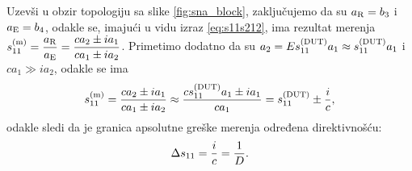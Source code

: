 \documentclass[a4paper, 12pt, diplomski]{etf}
\begin{document}
Uzevši u obzir 
topologiju sa slike \ref{fig:sna_block}, zaključujemo da su 
$a_{\rm R} = b_3$ i $a_{\rm E} = b_4$,
odakle se, imajući u 
vidu izraz \eqref{eq:s11s212}, ima rezultat merenja
$ s_{\rm 11}^{\rm (m)} = \dfrac{a_{\rm R}}{a_{\rm E}} = 
\dfrac{ ca_2 \pm ia_1}{ ca_1 \pm ia_2}$. Primetimo dodatno 
da su $a_2 = E s_{11}^{\rm (DUT)} a_1 \approx s_{\rm 11}^{\rm (DUT)} a_1 $ i 
$
    ca_1 \gg ia_2
    \label{eq:ca1ia2}
$, odakle se ima
\begin{equation}
    s_{\rm 11}^{\rm (m)} = 
\dfrac{ ca_2 \pm ia_1}{ ca_1 \pm ia_2}
\approx 
\dfrac{ c s_{\rm 11}^{\rm (DUT)} a_1 \pm ia_1}{ ca_1} 
= s_{\rm 11}^{\rm (DUT)} \pm \dfrac{i}{c},
\label{eq:ioverc}
\end{equation}
odakle sledi da je granica apsolutne greške
merenja određena direktivnošću:
\begin{equation}
\Delta s_{\rm 11} = \frac{i}{c} = \dfrac 1D.
\end{equation}
\end{document}
